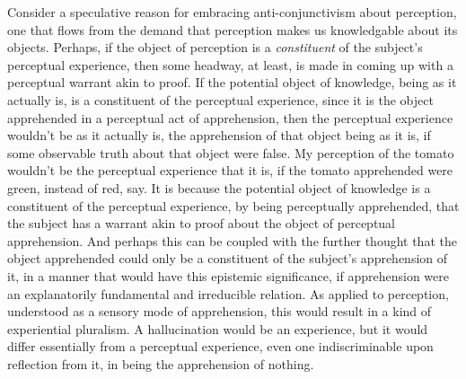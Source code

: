 \documentclass[12pt]{article}
\begin{document}
Consider a speculative reason for embracing anti-conjunctivism about perception, one that flows from the demand that perception makes us knowledgable about its objects. Perhaps, if the object of perception is a \emph{constituent} of the subject's perceptual experience, then some headway, at least, is made in coming up with a perceptual warrant akin to proof. If the potential object of knowledge, being as it actually is, is a constituent of the perceptual experience, since it is the object apprehended in a perceptual act of apprehension, then the perceptual experience wouldn't be as it actually is, the apprehension of that object being as it is, if some observable truth about that object were false. My perception of the tomato wouldn't be the perceptual experience that it is, if the tomato apprehended were green, instead of red, say. It is because the potential object of knowledge is a constituent of the perceptual experience, by being perceptually apprehended, that the subject has a warrant akin to proof about the object of perceptual apprehension. And perhaps this can be coupled with the further thought that the object apprehended could only be a constituent of the subject's apprehension of it, in a manner that would have this epistemic significance, if apprehension were an explanatorily fundamental and irreducible relation. As applied to perception, understood as a sensory mode of apprehension, this would result in a kind of experiential pluralism. A hallucination would be an experience, but it would differ essentially from a perceptual experience, even one indiscriminable upon reflection from it, in being the apprehension of nothing. 
\end{document}
